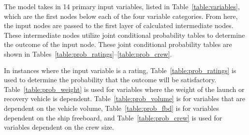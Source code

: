 \documentclass{svproc}
\begin{document}
The model takes in 14 primary input variables, listed in Table~\ref{table:variables}, which are the first nodes below each of the four variable categories. From here, the input nodes are passed to the first layer of calculated intermediate nodes. These intermediate nodes utilize joint conditional probability tables to determine the outcome of the input node. These joint conditional probability tables are shown in Tables~\ref{table:prob_ratings}--\ref{table:prob_crew}.

In instances where the input variable is a rating, Table~\ref{table:prob_ratings} is used to determine the probability that the outcome will be satisfactory. Table~\ref{table:prob_weight} is used for variables where the weight of the launch or recovery vehicle is dependent. Table~\ref{table:prob_volume} is for variables that are dependent on the vehicle volume, Table~\ref{table:prob_fbd} is for variables dependent on the ship freeboard, and Table~\ref{table:prob_crew} is used for variables dependent on the crew size. 
\end{document}
